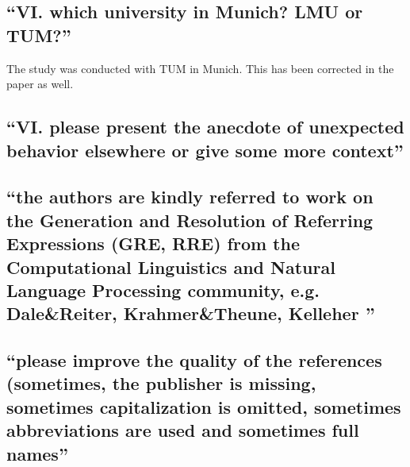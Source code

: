 \documentclass{article}
\begin{document}
\subsection{``VI. which university in Munich? LMU or TUM?''}

The study was conducted with TUM in Munich. This has been corrected in 
the paper as well.

\subsection{``VI. please present the anecdote of unexpected behavior elsewhere
or give some more context''}

\subsection{``the authors are kindly referred to work on the Generation and
Resolution of Referring Expressions (GRE, RRE) from the Computational
Linguistics and Natural Language Processing community, e.g. Dale\&Reiter,
Krahmer\&Theune, Kelleher ''}

\subsection{``please improve the quality of the references (sometimes, the
publisher is missing, sometimes capitalization is omitted, sometimes
abbreviations are used and sometimes full names''}
\end{document}

